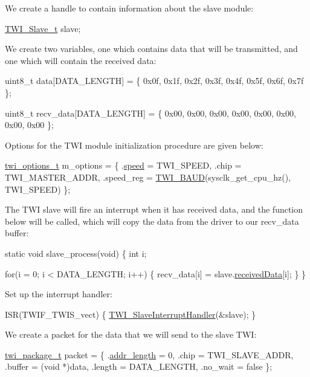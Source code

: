 We create a handle to contain information about the slave module\-: 
\begin{DoxyCode}
        \hyperlink{struct_t_w_i___slave}{TWI\_Slave\_t} slave;
\end{DoxyCode}


We create two variables, one which contains data that will be transmitted, and one which will contain the received data\-: 
\begin{DoxyCode}
         uint8\_t data[DATA\_LENGTH] = \{
             0x0f, 0x1f, 0x2f, 0x3f, 0x4f, 0x5f, 0x6f, 0x7f
         \};

         uint8\_t recv\_data[DATA\_LENGTH] = \{
             0x00, 0x00, 0x00, 0x00, 0x00, 0x00, 0x00, 0x00
         \};
\end{DoxyCode}


Options for the T\-W\-I module initialization procedure are given below\-: 
\begin{DoxyCode}
        \hyperlink{structtwi__options__t}{twi\_options\_t} m\_options = \{
            .\hyperlink{structtwi__options__t_ad81e7400d394a2f72d7ad84588d3d661}{speed}     = TWI\_SPEED,
            .chip      = TWI\_MASTER\_ADDR,
            .speed\_reg = \hyperlink{group__group__xmega__drivers__twi__twim_gaf373fdbc2054cf1a070ba2a24ddaedf3}{TWI\_BAUD}(sysclk\_get\_cpu\_hz(), TWI\_SPEED)
        \};
\end{DoxyCode}


The T\-W\-I slave will fire an interrupt when it has received data, and the function below will be called, which will copy the data from the driver to our recv\-\_\-data buffer\-: 
\begin{DoxyCode}
         \textcolor{keyword}{static} \textcolor{keywordtype}{void} slave\_process(\textcolor{keywordtype}{void}) \{
             \textcolor{keywordtype}{int} i;

             \textcolor{keywordflow}{for}(i = 0; i < DATA\_LENGTH; i++) \{
                 recv\_data[i] = slave.\hyperlink{struct_t_w_i___slave_a8c205728fdea8bcaeaa0f6f889d83d4d}{receivedData}[i];
             \}
         \}
\end{DoxyCode}


Set up the interrupt handler\-: 
\begin{DoxyCode}
        ISR(TWIF\_TWIS\_vect) \{
            \hyperlink{group__group__xmega__drivers__twi__twis_ga0b140fb1b0b3f204e5c748c5f585fbb2}{TWI\_SlaveInterruptHandler}(&slave);
        \}
\end{DoxyCode}


We create a packet for the data that we will send to the slave T\-W\-I\-: 
\begin{DoxyCode}
        \hyperlink{structtwi__package__t}{twi\_package\_t} packet = \{
            .\hyperlink{structtwi__package__t_a397e982e6fa809c3fb834309537ffdbd}{addr\_length} = 0,
            .chip        = TWI\_SLAVE\_ADDR,
            .buffer      = (\textcolor{keywordtype}{void} *)data,
            .length      = DATA\_LENGTH,
            .no\_wait     = \textcolor{keyword}{false}
        \};
\end{DoxyCode}


